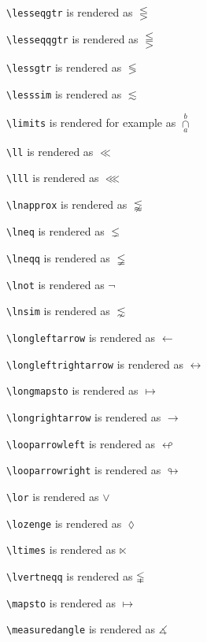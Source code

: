 \texttt{\textbackslash lesseqgtr} is rendered as $\lesseqgtr$

\texttt{\textbackslash lesseqqgtr} is rendered as $\lesseqqgtr$

\texttt{\textbackslash lessgtr} is rendered as $\lessgtr$

\texttt{\textbackslash lesssim} is rendered as $\lesssim$

\texttt{\textbackslash limits} is rendered for example as $\mathop\cap\limits_a^b$

\texttt{\textbackslash ll} is rendered as $\ll$

\texttt{\textbackslash lll} is rendered as $\lll$

\texttt{\textbackslash lnapprox} is rendered as $\lnapprox$

\texttt{\textbackslash lneq} is rendered as $\lneq$

\texttt{\textbackslash lneqq} is rendered as $\lneqq$

\texttt{\textbackslash lnot} is rendered as $\lnot$

\texttt{\textbackslash lnsim} is rendered as $\lnsim$





\texttt{\textbackslash longleftarrow} is rendered as $\longleftarrow$

\texttt{\textbackslash longleftrightarrow} is rendered as $\longleftrightarrow$



\texttt{\textbackslash longmapsto} is rendered as $\longmapsto$

\texttt{\textbackslash longrightarrow} is rendered as $\longrightarrow$



\texttt{\textbackslash looparrowleft} is rendered as $\looparrowleft$

\texttt{\textbackslash looparrowright} is rendered as $\looparrowright$

\texttt{\textbackslash lor} is rendered as $\lor$

\texttt{\textbackslash lozenge} is rendered as $\lozenge$

\texttt{\textbackslash ltimes} is rendered as $\ltimes$

\texttt{\textbackslash lvertneqq} is rendered as $\lvertneqq$

\texttt{\textbackslash mapsto} is rendered as $\mapsto$

\texttt{\textbackslash measuredangle} is rendered as $\measuredangle$

